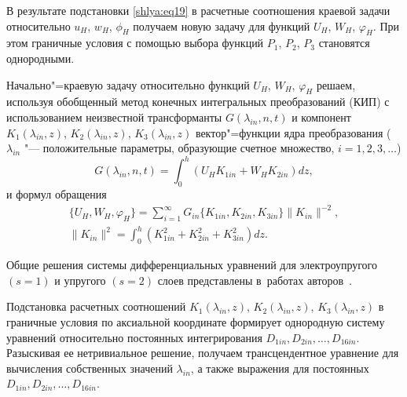 В результате подстановки \eqref{shlya:eq19} в расчетные соотношения краевой задачи 
относительно $u_H$, $w_H$, $\phi _H$ получаем новую задачу для функций $U_H$, $W_H$, $\varphi _H$. При этом граничные условия с помощью выбора функций $P_1$, $P_2$, $P_3$ становятся однородными.

Начально"=краевую задачу относительно функций $U_H$, $W_H$, $\varphi _H $ 
решаем, используя обобщенный метод конечных интегральных преобразований 
\mbox{(КИП)} \cite{shlya:bib24} с использованием неизвестной трансформанты $G(\lambda 
_{in},n,t )$ и компонент $K_1 (\lambda _{in} ,z)$, $K_2 (\lambda _{in} ,z )$, $K_3 (\lambda _{in} 
,z )$ вектор"=функции ядра преобразования ($\lambda _{in}$ "--- положительные параметры, образующие счетное множество, $i=1,2,3,\dots$)
\begin{equation}
\label{shlya:eq20}
G(\lambda _{in} ,n,t )=\int _0^h (U_H K_{1in}  +W_H K_{2in} )dz,
\end{equation}
и формул обращения
\begin{gather}
\label{shlya:eq21}
\bigl\{ U_H ,W_H ,\varphi _H \bigr\}=
\sum\limits_{i=1}^\infty 
G_{in}  \bigl\{ K_{1in} ,K_{2in} ,K_{3in} \bigr\}
\| K_{in} \|^{-2},\\
\| K_{in} \|^2=\int_0^h (K_{1in}^2 +K_{2in}^2 +K_{3in}^2 )dz.
\end{gather}

Общие решения системы дифференциальных уравнений для электроупругого $(s=1)$ и упругого $(s=2)$ слоев представлены в~работах авторов~\cite{shlya:bib18,shlya:bib26}. 

Подстановка расчетных соотношений $K_1 (\lambda_{in},z )$, $K_2 (\lambda _{in},z )$, $K_3 (\lambda _{in},z )$ в граничные условия по аксиальной координате формирует однородную систему уравнений относительно постоянных интегрирования $D_{1in}, D_{2in}, \dots,  D_{16in} $. 
Разыскивая ее нетривиальное решение, получаем трансцендентное уравнение для вычисления собственных значений $\lambda _{in} $, а также выражения для постоянных $D_{1in}, D_{2in}, \dots,  D_{16in} $. 

